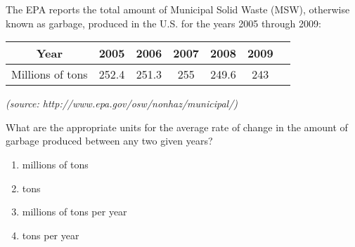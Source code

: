 \bigskip

\item The EPA reports the total amount of Municipal Solid Waste (MSW), otherwise known as garbage, produced in the U.S. for the years 2005 through 2009:


\begin{center}
\begin{tabular}{|c|c|c|c|c|c|c|}
\hline
Year & 2005&2006&2007&2008&2009\\
\hline
Millions of tons & 252.4 & 251.3 & 255 & 249.6 & 243\\
\hline
\end{tabular}
\end{center}

{\it (source: http://www.epa.gov/osw/nonhaz/municipal/)}

\bigskip

What are the appropriate units for the average rate of change in the amount of garbage produced between any two given years?

\begin{enumerate}
\item millions of tons
\item tons
\item millions of tons per year
\item tons per year
\end{enumerate}

